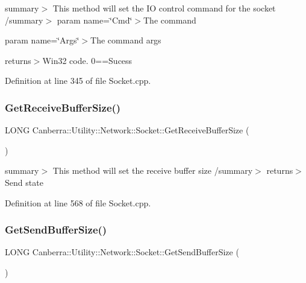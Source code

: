 summary$>$ This method will set the IO control command for the socket /summary$>$ param name=\char`\"{}\+Cmd\char`\"{}$>$The command

param name=\char`\"{}\+Args\char`\"{}$>$The command args

returns$>$Win32 code. 0==Sucess

Definition at line 345 of file Socket.\+cpp.

\mbox{\label{class_canberra_1_1_utility_1_1_network_1_1_socket_a99152360e98453ea36c869992a7a7741_a99152360e98453ea36c869992a7a7741}} 
\subsubsection{\texorpdfstring{Get\+Receive\+Buffer\+Size()}{GetReceiveBufferSize()}}
{\footnotesize\ttfamily L\+O\+NG Canberra\+::\+Utility\+::\+Network\+::\+Socket\+::\+Get\+Receive\+Buffer\+Size (\begin{DoxyParamCaption}{ }\end{DoxyParamCaption})}

summary$>$ This method will set the receive buffer size /summary$>$ returns$>$Send state

Definition at line 568 of file Socket.\+cpp.

\mbox{\label{class_canberra_1_1_utility_1_1_network_1_1_socket_a1f7685d86280a534449da44a3250ff36_a1f7685d86280a534449da44a3250ff36}} 
\subsubsection{\texorpdfstring{Get\+Send\+Buffer\+Size()}{GetSendBufferSize()}}
{\footnotesize\ttfamily L\+O\+NG Canberra\+::\+Utility\+::\+Network\+::\+Socket\+::\+Get\+Send\+Buffer\+Size (\begin{DoxyParamCaption}{ }\end{DoxyParamCaption})}

